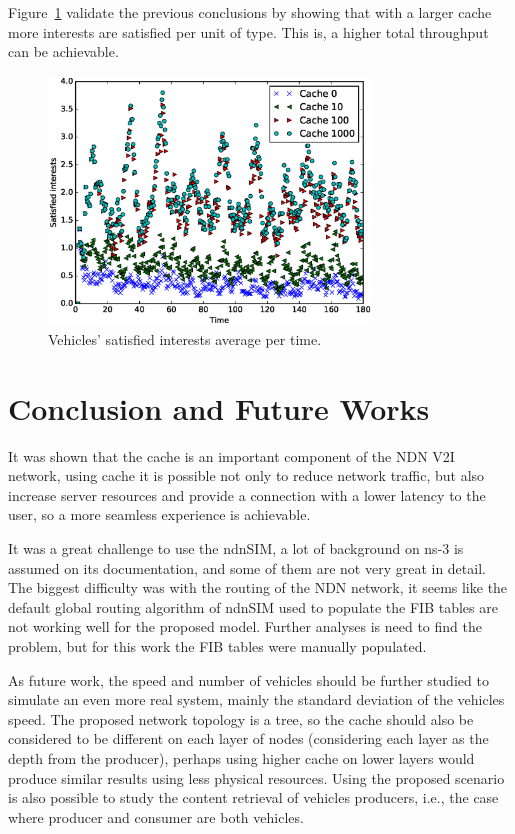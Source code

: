 \documentclass[10pt,a4paper,final]{IEEEtran}
\begin{document}
Figure~\ref{fig:satisfied} validate the previous conclusions by showing that
with a larger cache more interests are satisfied per unit of type. This is, a
higher total throughput can be achievable.

\begin{figure}
\centering
\includegraphics[height=2.6in]{satisfied}
\caption{Vehicles' satisfied interests average per time.}\label{fig:satisfied}
\end{figure}

\section{Conclusion and Future Works}\label{sec:conc}

It was shown that the cache is an important component of the NDN V2I network,
using cache it is possible not only to reduce network traffic, but also
increase server resources and provide a connection with a lower latency to the
user, so a more seamless experience is achievable.

It was a great challenge to use the ndnSIM, a lot of background on ns-3 is
assumed on its documentation, and some of them are not very great in detail.
The biggest difficulty was with the routing of the NDN network, it seems like
the default global routing algorithm of ndnSIM used to populate the FIB tables
are not working well for the proposed model. Further analyses is need to find
the problem, but for this work the FIB tables were manually populated.

As future work, the speed and number of vehicles should be further studied to
simulate an even more real system, mainly the standard deviation of the
vehicles speed. The proposed network topology is a tree, so the cache should
also be considered to be different on each layer of nodes (considering each
layer as the depth from the producer), perhaps using higher cache on lower
layers would produce similar results using less physical resources. Using the
proposed scenario is also possible to study the content retrieval of vehicles
producers, i.e., the case where producer and consumer are both vehicles.



\end{document}
